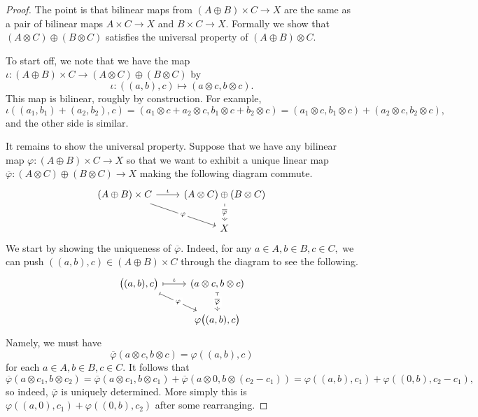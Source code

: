\begin{proof}
	The point is that bilinear maps from $(A\oplus B)\times C\to X$ are the same as a pair of bilinear maps $A\times C\to X$ and $B\times C\to X.$ Formally we show that $(A\otimes C)\oplus(B\otimes C)$ satisfies the universal property of $(A\oplus B)\otimes C.$

	To start off, we note that we have the map $\iota:(A\oplus B)\times C\to(A\otimes C)\oplus(B\otimes C)$ by
	\[\iota:((a,b),c)\mapsto(a\otimes c,b\otimes c).\]
	This map is bilinear, roughly by construction. For example,
	\[\iota((a_1,b_1)+(a_2,b_2),c)=(a_1\otimes c+a_2\otimes c,b_1\otimes c+b_2\otimes c)=(a_1\otimes c,b_1\otimes c)+(a_2\otimes c,b_2\otimes c),\]
	and the other side is similar.

	It remains to show the universal property. Suppose that we have any bilinear map $\varphi:(A\oplus B)\times C\to X$ so that we want to exhibit a unique linear map $\overline\varphi:(A\otimes C)\oplus(B\otimes C)\to X$ making the following diagram commute.
	\[\begin{tikzcd}
		{(A\oplus B)\times C} & {(A\otimes C)\oplus(B\otimes C)} \\
		& X
		\arrow["\iota", from=1-1, to=1-2]
		\arrow["\varphi"{description}, from=1-1, to=2-2]
		\arrow["\overline\varphi"{description}, dashed, from=1-2, to=2-2]
	\end{tikzcd}\]
	We start by showing the uniqueness of $\overline\varphi.$ Indeed, for any $a\in A,b\in B,c\in C,$ we can push $((a,b),c)\in(A\oplus B)\times C$ through the diagram to see the following.
	\[\begin{tikzcd}
		{\big((a,b),c\big)} & {(a\otimes c,b\otimes c)} \\
		& {\varphi\big((a,b),c\big)}
		\arrow["\iota", maps to, from=1-1, to=1-2]
		\arrow["\varphi"{description}, maps to, from=1-1, to=2-2]
		\arrow["\overline\varphi"{description}, dashed, maps to, from=1-2, to=2-2]
	\end{tikzcd}\]
	Namely, we must have
	\[\overline\varphi(a\otimes c,b\otimes c)=\varphi((a,b),c)\]
	for each $a\in A,b\in B,c\in C.$ It follows that
	\[\overline\varphi(a\otimes c_1,b\otimes c_2)=\overline\varphi(a\otimes c_1,b\otimes c_1)+\overline\varphi(a\otimes0,b\otimes(c_2-c_1))=\varphi((a,b),c_1)+\varphi((0,b),c_2-c_1),\]
	so indeed, $\overline\varphi$ is uniquely determined. More simply this is $\varphi((a,0),c_1)+\varphi((0,b),c_2)$ after some rearranging.
	

\end{proof}
